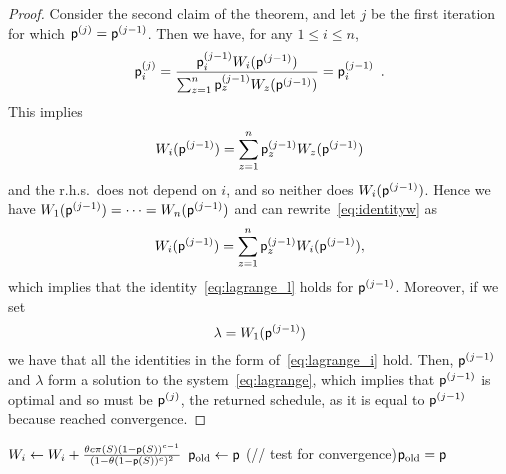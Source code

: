 \begin{proof}
	Consider the second claim of the theorem, and let $j$ be the
	first iteration for which $\mathsf{p}^{(j)}=\mathsf{p}^{(j-1)}$. Then we have, for
	any $1\le i\le n$,
	\[
		\mathsf{p}^{(j)}_i = \frac{\mathsf{p}^{(j-1)}_i W_i(\mathsf{p}^{(j-1)})}{\sum_{z=1}^n
		\mathsf{p}^{(j-1)}_z W_z(\mathsf{p}^{(j-1)})} = \mathsf{p}^{(j-1)}_i\enspace.
	\]
	This implies
	\begin{equation}\label{eq:identityw}
		W_i(\mathsf{p}^{(j-1)}) = \sum_{z=1}^n \mathsf{p}^{(j-1)}_z W_z(\mathsf{p}^{(j-1)})
	\end{equation}
	and the r.h.s.~does not depend on $i$, and so neither does
	$W_i(\mathsf{p}^{(j-1)})$. Hence we have
	$W_1(\mathsf{p}^{(j-1)})=\dotsb=W_n(\mathsf{p}^{(j-1)})$ and can
	rewrite~\eqref{eq:identityw} as
	\[
		W_i(\mathsf{p}^{(j-1)}) =  \sum_{z=1}^n \mathsf{p}^{(j-1)}_z
		W_i(\mathsf{p}^{(j-1)}),
	\]
	which implies that the identity~\eqref{eq:lagrange_l} holds for
	$\mathsf{p}^{(j-1)}$. Moreover, if we set
	\[
		\lambda = W_1(\mathsf{p}^{(j-1)})
	\]
	we have that all the identities in the form of~\eqref{eq:lagrange_i} hold.
	Then, $\mathsf{p}^{(j-1)}$ and $\lambda$ form a solution to the
	system~\eqref{eq:lagrange}, which implies that $\mathsf{p}^{(j-1)}$ is optimal
	and so must be $\mathsf{p}^{(j)}$, the returned schedule, as it is equal to
	$\mathsf{p}^{(j-1)}$ because \algoname reached convergence.
\end{proof}

\begin{algorithm}[ht]
	\DontPrintSemicolon
	 {
		 {\label{algline:sum}
			 {
				$W_i \leftarrow W_i + \frac{\theta c \pi(S) (1-\mathsf{p}(S))^{c-1}}{(1-\theta(1-\mathsf{p}(S))^c)^2}$\label{algline:w}\;
			}
		}
		$\mathsf{p}_{\mathrm{old}}\leftarrow \mathsf{p}$\;
		\If(// test for convergence){$\mathsf{p}_{\mathrm{old}} = \mathsf{p}$} {
			\KwBreak\;
		}
	}
	\Return{$\sched$}\;
	\caption{\algoname}
	\label{alg:iterative}
\end{algorithm}

